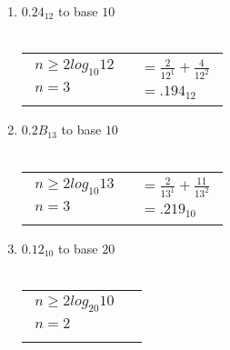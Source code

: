 \documentclass[12pt]{article}
\begin{document}
\begin{enumerate}
     \item $0.24_{12}$ to base $10$ \\ \\
     \begin{tabular}{l | l}

        $\begin{aligned}
            n \geq 2log_{10}12 \\
            n = 3 \\
        \end{aligned}$

        &

        $\begin{aligned}
            = \frac{2}{12^1} + \frac{4}{12^2} \\
            = \boxed{.194_{12}}
        \end{aligned}$

     \end{tabular}
     

     \item $0.2B_{13}$ to base $10$ \\ \\
     \begin{tabular}{l | l}

        $\begin{aligned}
            n \geq 2log_{10}13 \\
            n = 3 \\
        \end{aligned}$

        &

        $\begin{aligned}
            = \frac{2}{13^1} + \frac{11}{13^2} \\
            = \boxed{.219_{10}}
        \end{aligned}$

     \end{tabular}
     

     \item $0.12_{10}$ to base $20$ \\  \\
     \begin{tabular}{l | l}

        $\begin{aligned}
            n \geq 2log_{20}10 \\
            n = 2 \\
        \end{aligned}$


\end{tabular}
\end{enumerate}
\end{document}

